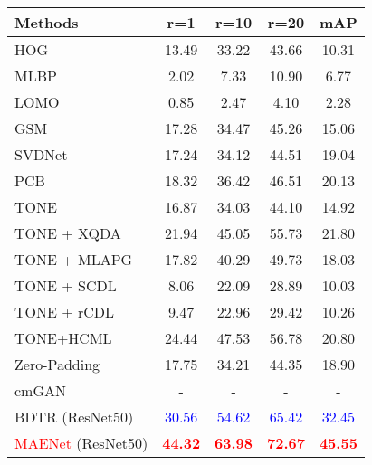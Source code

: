 \begin{table}[!htpb]
  \centering
  \begin{tabular}{cccccc}
     \\ \hline 
  \multicolumn{2}{l|}{Methods} & r=1  &r=10 & r=20 & mAP   \\\hline
  
  \multicolumn{2}{l|}{HOG} & 13.49 & 33.22 & 43.66 & 10.31  \\
  \multicolumn{2}{l|}{MLBP} &  2.02& 7.33 & 10.90 & 6.77  \\
  \multicolumn{2}{l|}{LOMO\cite{liao2015person}} &  0.85& 2.47 & 4.10 & 2.28  \\
  \multicolumn{2}{l|}{GSM\cite{lin2016cross}} &  17.28& 34.47 & 45.26 & 15.06  \\

  \hline
  \hline
  \multicolumn{2}{l|}{SVDNet\cite{sun2017svdnet}} &  17.24& 34.12 & 44.51 & 19.04  \\
  \multicolumn{2}{l|}{PCB\cite{sun2018beyond}} & 18.32& 36.42 & 46.51& 20.13   \\ 
  \hline
  \hline
  \multicolumn{2}{l|}{TONE\cite{ye2018hierarchical}} &  16.87& 34.03 & 44.10 & 14.92  \\
  \multicolumn{2}{l|}{TONE + XQDA} &  21.94 & 45.05 & 55.73 & 21.80  \\
  \multicolumn{2}{l|}{TONE + MLAPG} &  17.82 & 40.29 & 49.73 & 18.03  \\
  \multicolumn{2}{l|}{TONE + SCDL} &  8.06 & 22.09 & 28.89 & 10.03  \\
  \multicolumn{2}{l|}{TONE + rCDL} &  9.47 & 22.96 & 29.42 & 10.26  \\
  \multicolumn{2}{l|}{TONE+HCML }& 24.44 & 47.53 & 56.78 & 20.80 \\
  \multicolumn{2}{l|}{Zero-Padding\cite{wu2017rgb} }& 17.75 &34.21 & 44.35 & 18.90  \\
  \multicolumn{2}{l|}{cmGAN\cite{dai2018cross} }& - & - & - & -  \\
  \multicolumn{2}{l|}{BDTR (ResNet50)\cite{ye2018visible} }& \textcolor{blue}{30.56} & \textcolor{blue}{54.62} & \textcolor{blue}{65.42} & \textcolor{blue}{32.45}  \\
  \hline
  \hline
   \multicolumn{2}{l|}{\textcolor{red}{MAENet} (ResNet50) }&\textcolor{red}{\textbf{44.32}} & \textcolor{red}{\textbf{63.98}} & \textcolor{red}{\textbf{72.67}} & \textcolor{red}{\textbf{45.55}} \\
   \hline
   \hline
  \end{tabular}
  \label{table:visiblethermalRegdb}
\end{table}
